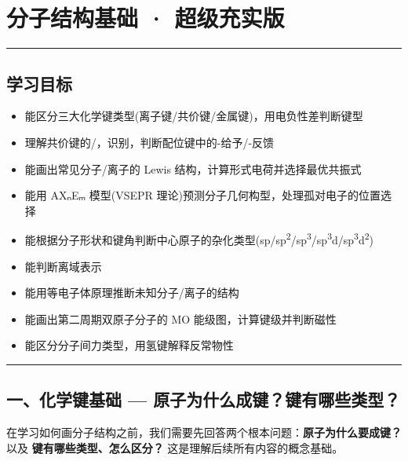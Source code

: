 \section{分子结构基础 · 超级充实版}\label{ux5206ux5b50ux7ed3ux6784ux57faux7840-ux8d85ux7ea7ux5145ux5b9eux7248}

\begin{center}\rule{0.5\linewidth}{0.5pt}\end{center}

\subsection{学习目标}\label{ux5b66ux4e60ux76eeux6807}

\begin{itemize}
\tightlist
\item
  能区分三大化学键类型(离子键/共价键/金属键)，用电负性差判断键型
\item
  理解共价键的/，识别，判断配位键中的-给予/\派-反馈
\item
  能画出常见分子/离子的 Lewis 结构，计算形式电荷并选择最优共振式
\item
  能用 AXₙEₘ 模型(VSEPR 理论)预测分子几何构型，处理孤对电子的位置选择
\item
  能根据分子形状和键角判断中心原子的杂化类型(sp/sp\textsuperscript{2}/sp\textsuperscript{3}/sp\textsuperscript{3}d/sp\textsuperscript{3}d\textsuperscript{2})
\item
  能判断离域  表示
\item
  能用等电子体原理推断未知分子/离子的结构
\item
  能画出第二周期双原子分子的 MO 能级图，计算键级并判断磁性
\item
  能区分分子间力类型，用氢键解释反常物性
\end{itemize}

\begin{center}\rule{0.5\linewidth}{0.5pt}\end{center}

\subsection{一、化学键基础 --- 原子为什么成键？键有哪些类型？}\label{ux4e00ux5316ux5b66ux952eux57faux7840-ux539fux5b50ux4e3aux4ec0ux4e48ux6210ux952eux952eux6709ux54eaux4e9bux7c7bux578b}

在学习如何画分子结构之前，我们需要先回答两个根本问题：\textbf{原子为什么要成键？} 以及 \textbf{键有哪些类型、怎么区分？} 这是理解后续所有内容的概念基础。

